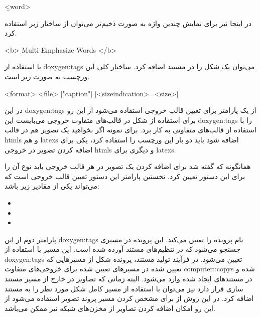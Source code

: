 \begin{doxygen}
\b <word>
\end{doxygen}

در اینجا نیز برای نمایش چندین واژه به صورت ذخیم‌تر می‌توان از ساختار زیر استفاده
کرد.

\begin{doxygen}
<b> Multi Emphasize Words </b>
\end{doxygen}



با استفاده از \glspl{doxygen:tag}  می‌توان یک شکل را در مستند اضافه
کرد. ساختار کلی این ورچسب به صورت زیر است.
 
\begin{doxygen}
\image <format> <file> ["caption"] [<sizeindication>=<size>]
\end{doxygen}

در این \glspl{doxygen:tag} از یک پارامتر برای تعیین قالب خروجی استفاده
می‌شود از این رو برای استفاده از شکل در قالب‌های متفاوت خروجی می‌بایست این
\glspl{doxygen:tag} را با استفاده از قالب‌های متفاوتی به کار برد. برای نمونه
اگر بخواهید یک تصویر هم در قالب \glspl{html} و هم \glspl{latex} اضافه شود باید
دو بار این ورچسب را استفاده کرد، یکی برای اضافه کردن تصویر در خروجی \glspl{html}
و دیگری برای \glspl{latex}.

همانگونه که گفته شد برای اضافه کردن یک تصویر در هر قالب خروجی باید نوع آن را
برای این دستور تعیین کرد. نخستین پارامتر این دستور تعیین قالب خروجی است که
می‌تواند یکی از مقادیر زیر باشد:

\begin{itemize}
  \item {}
  \item {}
  \item {}
\end{itemize}

پارامتر دوم از این \glspl{doxygen:tag} نام پرونده‌ را تعیین می‌کند.  این پرونده
در مسیری جستجو می‌شود که در تنظیم‌های مستند آورده شده است. این مسیر با استفاده
از \glspl{doxygen:tag}  تعیین می‌شود. در فرآیند تولید مستند،
پرونده شکل از مسیرهایی که تعیین شده در مسیرهای تعیین شده برای خروجی‌های متفاوت
\glspl{computer::copy} شده و در مستند‌های ایجاد شده وارد می‌شود. البته زمانی که تصاویر در
خارج از مسیر مستند سازی قرار دارد نیز می‌توان با استفاده از مسیر کامل شکل مورد
نظر را به مستند اضافه کرد. در این روش از  برای مشخص کردن مسیر پروند
تصویر استفاده می‌شود از این رو امکان اضافه کردن تصاویر از مخزن‌های شبکه نیز ممکن می‌باشد.


